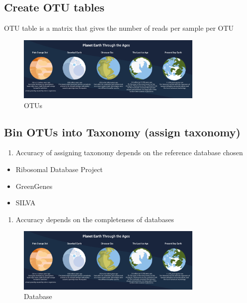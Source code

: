 \documentclass[
]{book}
\providecommand{\tightlist}{%
  \setlength{\itemsep}{0pt}\setlength{\parskip}{0pt}}
\begin{document}
\hypertarget{create-otu-tables}{%
\subsection{Create OTU tables}\label{create-otu-tables}}

OTU table is a matrix that gives the number of reads per sample per OTU

\begin{figure}
\centering
\includegraphics[width=0.8\textwidth,height=\textheight]{./Figures/Planets.png}
\caption{OTUs}
\end{figure}

\hypertarget{bin-otus-into-taxonomy-assign-taxonomy}{%
\subsection{Bin OTUs into Taxonomy (assign taxonomy)}\label{bin-otus-into-taxonomy-assign-taxonomy}}

\begin{enumerate}
\def\labelenumi{\arabic{enumi}.}
\tightlist
\item
  Accuracy of assigning taxonomy depends on the
  reference database chosen
\end{enumerate}

\begin{itemize}
\tightlist
\item
  Ribosomal Database Project
\item
  GreenGenes
\item
  SILVA
\end{itemize}

\begin{enumerate}
\def\labelenumi{\arabic{enumi}.}
\setcounter{enumi}{1}
\tightlist
\item
  Accuracy depends on the completeness of databases
\end{enumerate}

\begin{figure}
\centering
\includegraphics[width=0.8\textwidth,height=\textheight]{./Figures/Planets.png}
\caption{Database}
\end{figure}
\end{document}
